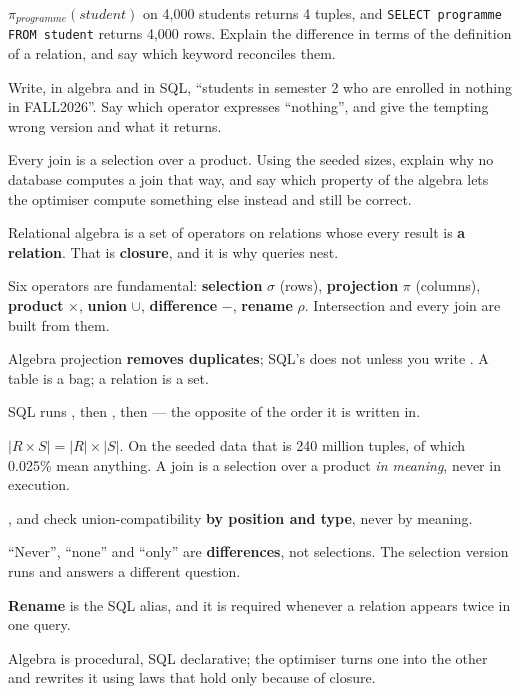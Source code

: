 \begin{checkpoint}
\begin{tightnum}
  \item $\pi_{\mathit{programme}}(\mathit{student})$ on 4{,}000 students
        returns 4 tuples, and \texttt{SELECT programme FROM student} returns
        4{,}000 rows. Explain the difference in terms of the definition of a
        relation, and say which keyword reconciles them.
  \item Write, in algebra and in SQL, ``students in semester 2 who are
        enrolled in nothing in FALL2026''. Say which operator expresses
        ``nothing'', and give the tempting wrong version and what it returns.
  \item Every join is a selection over a product. Using the seeded sizes,
        explain why no database computes a join that way, and say which
        property of the algebra lets the optimiser compute something else
        instead and still be correct.
\end{tightnum}
\end{checkpoint}

\begin{chaptersummary}
\begin{tight}
  \item Relational algebra is a set of operators on relations whose every
        result is \textbf{a relation}. That is \textbf{closure}, and it is why
        queries nest.
  \item Six operators are fundamental: \textbf{selection} $\sigma$ (rows),
        \textbf{projection} $\pi$ (columns), \textbf{product} $\times$,
        \textbf{union} $\cup$, \textbf{difference} $-$, \textbf{rename}
        $\rho$. Intersection and every join are built from them.
  \item Algebra projection \textbf{removes duplicates}; SQL's does not unless
        you write . A table is a bag; a relation is a set.
  \item SQL runs , then , then  --- the
        opposite of the order it is written in.
  \item $|R \times S| = |R| \times |S|$. On the seeded data that is 240
        million tuples, of which 0.025\% mean anything. A join is a selection
        over a product \emph{in meaning}, never in execution.
  \item {},  and  check
        union-compatibility \textbf{by position and type}, never by meaning.
  \item ``Never'', ``none'' and ``only'' are \textbf{differences}, not
        selections. The selection version runs and answers a different
        question.
  \item \textbf{Rename} is the SQL alias, and it is required whenever a
        relation appears twice in one query.
  \item Algebra is procedural, SQL declarative; the optimiser turns one into
        the other and rewrites it using laws that hold only because of
        closure.
\end{tight}
\end{chaptersummary}

